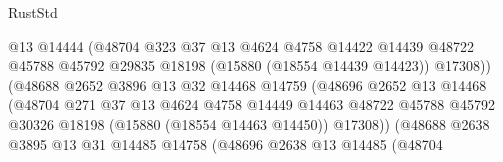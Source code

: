 \begin{lexlean}{RustStd}
\begin{coremodule}
                                      @13
                                      @14444
                                      (@48704
                                        @323
                                        @37
                                        @13
                                        @4624
                                        @4758
                                        @14422
                                        @14439
                                        @48722
                                        @45788
                                        @45792
                                        @29835
                                        @18198
                                        (@15880 (@18554 @14439 @14423))
                                        @17308))
                                    (@48688
                                      @2652
                                      @3896
                                      @13
                                      @32
                                      @14468
                                      @14759
                                      (@48696
                                        @2652
                                        @13
                                        @14468
                                        (@48704
                                          @271
                                          @37
                                          @13
                                          @4624
                                          @4758
                                          @14449
                                          @14463
                                          @48722
                                          @45788
                                          @45792
                                          @30326
                                          @18198
                                          (@15880 (@18554 @14463 @14450))
                                          @17308))
                                      (@48688
                                        @2638
                                        @3895
                                        @13
                                        @31
                                        @14485
                                        @14758
                                        (@48696
                                          @2638
                                          @13
                                          @14485
                                          (@48704

\end{coremodule}
\end{lexlean}

